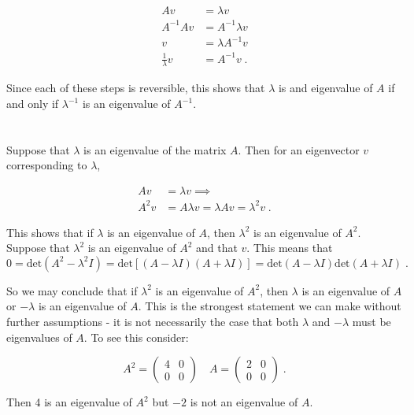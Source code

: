 \documentclass[11pt]{article}
\begin{document}
\begin{align*}
Av &= \lambda v \\
A^{-1}Av &= A^{-1} \lambda v\\
v &= \lambda A^{-1} v\\
\frac{1}{\lambda}v &= A^{-1}v \;.
\end{align*}

Since each of these steps is reversible, this shows that $\lambda$ is and eigenvalue of $A$ if and only if $\lambda^{-1}$ is an eigenvalue of $A^{-1}$. 

\section{}

Suppose that $\lambda$ is an eigenvalue of the matrix $A$. Then for an eigenvector $v$ corresponding to $\lambda$, 

\begin{align*}
Av &= \lambda v \implies \\
A^2v &= A\lambda v = \lambda Av = \lambda^2v \;.
\end{align*}

This shows that if $\lambda$ is an eigenvalue of $A$, then $\lambda^2$ is an eigenvalue of $A^2$. \\

Suppose that $\lambda^2$ is an eigenvalue of $A^2$ and that $v$. This means that $$0 = \text{det}(A^2 - \lambda^2I) = \text{det}[(A-\lambda I)(A+\lambda I)] = \text{det}(A - \lambda I) \text{det}(A+ \lambda I) \;.$$

So we may conclude that if $\lambda^2$ is an eigenvalue of $A^2$, then $\lambda$ is an eigenvalue of $A$ or $-\lambda$ is an eigenvalue of $A$. This is the strongest statement we can make without further assumptions - it is not necessarily the case that both $\lambda$ and $-\lambda$ must be eigenvalues of $A$. To see this consider:

$$A^2 = \begin{pmatrix}
4 & 0 \\ 0 & 0
\end{pmatrix} \quad A =\begin{pmatrix}
2 & 0 \\ 0 & 0
\end{pmatrix} \;.$$

Then 4 is an eigenvalue of $A^2$ but $-2$ is not an eigenvalue of $A$. 

\section{}
\end{document}

